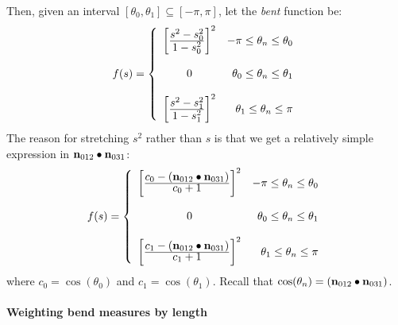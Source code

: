 Then, 
given an interval $\left[ \theta_0, \theta_1 \right] \subseteq \left[ -\pi, \pi \right]$,
let the {\it bent} function be:
\begin{equation}
f(s)
= 
\left\{
\begin{array}{cr}
\left[ {  
\frac{\textstyle
s^2 - s_0^2}
{\textstyle
1 - s_0^2}
  } \right]^2 
& -\pi \leq \theta_n \leq \theta_0
\\
\\
0                            
& \theta_0 \leq \theta_n \leq \theta_1
\\
\\
\left[ {
  {\textstyle s^2 - s_1^2} 
  \over 
  {\textstyle 1 - s_1^2}
  } \right]^2  
& \theta_1 \leq \theta_n \leq \pi
\end{array}
\right.
\end{equation}
The reason for stretching $s^2$ rather than $s$
is that we get a relatively simple expression
in ${\mathbf n}_{012} \bullet {\mathbf n}_{031}$:
\begin{equation}
f(s)
= 
\left\{
\begin{array}{cr}
\left[ {
  {\textstyle c_0 - \left({\mathbf n}_{012} \bullet {\mathbf n}_{031}\right) } 
  \over 
  {\textstyle c_0 + 1}
   } \right]^2
& -\pi \leq \theta_n \leq \theta_0
\\
\\
0                            
& \theta_0 \leq \theta_n \leq \theta_1
\\
\\
\left[ {\textstyle {c_1 - \left({\mathbf n}_{012} \bullet {\mathbf n}_{031}\right)} 
    \over {\textstyle c_1 + 1}} \right]^2
& \theta_1 \leq \theta_n \leq \pi
\end{array}
\right.
\end{equation}
where $c_0 = \cos(\theta_0)$
and $c_1 = \cos(\theta_1)$.
Recall that $\cos(\theta_n) = \left({\mathbf n}_{012} \bullet {\mathbf n}_{031}\right)$.


\paragraph{Weighting bend measures by length}
\label{sec:length_weighted_bend}

